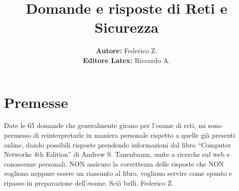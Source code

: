 

\author{\textbf{Autore:} Federico Z. \\ \textbf{Editore Latex:} Riccardo A.}
\title{Domande e risposte di Reti e Sicurezza}



\maketitle

\section*{Premesse}
Date le 65 domande che generalmente girano per l’esame di reti, mi sono permesso di reinterpretarle in maniera personale rispetto a quelle già presenti online, dando possibili risposte prendendo informazioni dal libro “Computer Networks 4th Edition” di Andrew S. Tanenbaum, unite a ricerche sul web e conoscenze personali. NON assicuro la correttezza delle risposte che NON vogliono neppure essere un riassunto al libro, vogliono servire come spunto e ripasso in preparazione dell’esame. Scià belli.
Federico Z.


\tableofcontents



